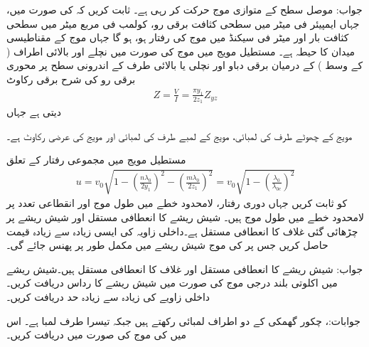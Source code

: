 جواب: 
موصل سطح کے متوازی  موج حرکت کر رہی ہے۔ ثابت کریں کہ  کی صورت میں، جہاں  ایمپیئر فی میٹر میں سطحی کثافت برقی رو،  کولمب فی مربع میٹر میں سطحی کثافت بار اور  میٹر فی سیکنڈ میں موج کی رفتار ہو،  ہو گا جہاں  موج کے مقناطیسی میدان  کا حیطہ ہے۔
مستطیل مویج میں  موج کی صورت میں نچلے اور بالائی اطراف ( کے وسط ) کے درمیان برقی دباو  اور نچلی یا بالائی طرف کے اندرونی سطح پر محوری برقی رو  کی شرح برقی رکاوٹ  
\begin{align}
Z=\frac{V}{I}=\frac{\pi y_1}{2 z_1} Z_{yz}
\end{align}
دیتی ہے جہاں
\begin{description}
 مویج کے چھوٹے طرف کی لمبائی،
 مویج کے لمبے طرف کی لمبائی اور
 مویج کی عرضی رکاوٹ ہے۔
\end{description}
مستطیل مویج میں مجموعی رفتار  کے تعلق
\begin{align}
u=v_0 \sqrt{1-\left(\frac{n \lambda_0}{2 y_1}\right)^2-\left(\frac{m \lambda_0}{2 z_1}\right)^2}=v_0 \sqrt{1-\left(\frac{\lambda_0}{\lambda_{0c}}\right)^2}
\end{align}
کو ثابت کریں جہاں  دوری رفتار،  لامحدود خطے میں طول موج اور  انقطاعی تعدد پر لامحدود خطے میں طول موج ہیں۔
شیش ریشے کا  انعطافی مستقل  اور شیش ریشے پر چڑھائی گئی غلاف کا  انعطافی مستقل  ہے۔داخلی زاویہ  کی ایسی زیادہ سے زیادہ قیمت حاصل کریں جس پر  کی موج شیش ریشے میں مکمل طور پر پھنس جائے گی۔

جواب: 
شیش ریشے کا  انعطافی مستقل  اور غلاف کا  انعطافی مستقل  ہیں۔شیش ریشے میں اکلوتی  بلند درجی موج کی صورت میں شیش ریشے کا رداس دریافت کریں۔ داخلی زاویے کی زیادہ سے زیادہ حد دریافت کریں۔

جوابات:، 
چکور گھمکی کے دو اطراف  لمبائی رکھتے ہیں جبکہ تیسرا طرف  لمبا ہے۔ اس میں  کی  موج کی صورت میں  دریافت کریں۔

